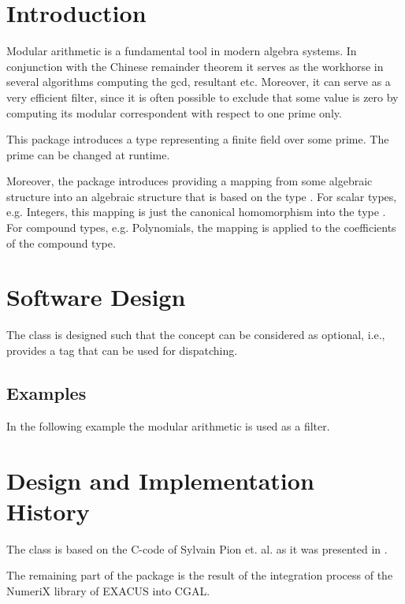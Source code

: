 \cleardoublepage
{}



\section{Introduction}

Modular arithmetic is a fundamental tool in modern algebra systems. In conjunction with the Chinese remainder theorem it serves as the workhorse in several algorithms computing the gcd, resultant etc. Moreover, it can serve as a very efficient filter, since it is often possible to exclude that some value is zero by computing its modular correspondent with respect to one prime only. 

This package introduces a type 
representing a finite field over some prime. 
The prime can be changed at runtime. 

Moreover, the package introduces  
providing a mapping from some algebraic structure  into an algebraic 
structure that is based on the type .  
For scalar types, e.g. Integers, this mapping is just the canonical homomorphism
into the type . 
For compound types, e.g. Polynomials, the mapping is applied to the 
coefficients of the compound type. 


\section{Software Design}

The class  is designed such that the concept 
 can be considered as optional, i.e., 
 provides a tag that can be used for dispatching. 

\subsection{Examples}

In the following example the modular arithmetic is used as a filter. 


\section{Design and Implementation History}

The class  is based on the C-code of Sylvain Pion et. al. 
as it was presented in \cite{bepp-sdrns-99}. 

The remaining part of the package is the result of the integration process
of the NumeriX library of EXACUS \cite{beh+-eeeafcs-05} into CGAL. 

